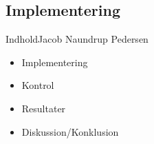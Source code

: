 \subsection{Implementering}


\begin{frame}{Indhold}{Jacob Naundrup Pedersen}
 \vfill\vfill\centering  
\begin{itemize}
	
\item Implementering \vspace{2mm}
\item Kontrol \vspace{2mm}
\item Resultater \vspace{2mm}
\item Diskussion/Konklusion \vspace{2mm}
\end{itemize}
 \vfill\vfill
\end{frame}


